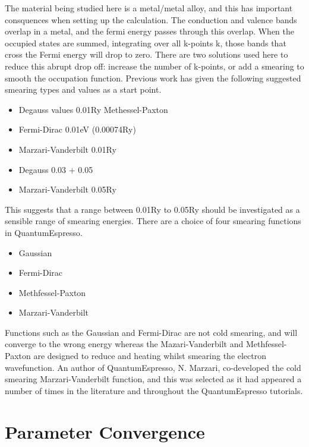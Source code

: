 The material being studied here is a metal/metal alloy, and this has important consquences when setting up the calculation.  The conduction and valence bands overlap in a metal, and the fermi energy passes through this overlap. When the occupied states are summed, integrating over all k-points k\cite{marzarivanderbilt}, those bands that cross the Fermi energy will drop to zero.  There are two solutions used here to reduce this abrupt drop off: increase the number of k-points, or add a smearing to smooth the occupation function.  Previous work has given the following suggested smearing types and values as a start point.

\begin{itemize}
\item Degauss values 0.01Ry Methessel-Paxton \cite{AdsorptionBR2}
\item Fermi-Dirac 0.01eV (0.00074Ry) \cite{NaDiffusion}
\item Marzari-Vanderbilt 0.01Ry \cite{ScBiandYBi}
\item Degauss 0.03 + 0.05 \cite{CuandPd}
\item Marzari-Vanderbilt 0.05Ry \cite{ecHeuslerAlloy}
\end{itemize}

This suggests that a range between 0.01Ry to 0.05Ry should be investigated as a sensible range of smearing energies.  There are a choice of four smearing functions in QuantumEspresso.

\begin{itemize}
\item Gaussian
\item Fermi-Dirac
\item Methfessel-Paxton
\item Marzari-Vanderbilt
\end{itemize}

Functions such as the Gaussian and Fermi-Dirac are not cold smearing, and will converge to the wrong energy whereas the Mazari-Vanderbilt and Methfessel-Paxton are designed to reduce and heating whilst smearing the electron wavefunction.  An author of QuantumEspresso, N. Marzari, co-developed the cold smearing Marzari-Vanderbilt function, and this was selected as it had appeared a number of times in the literature and throughout the QuantumEspresso tutorials.  






\section{Parameter Convergence}

